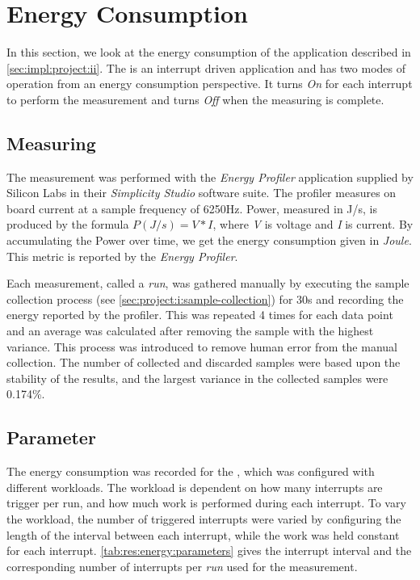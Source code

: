 \section{Energy Consumption}
\label{sec:res:energy}

In this section, we look at the energy consumption of the {\tracker} application described in \autoref{sec:impl:project:ii}.
The {\tracker} is an interrupt driven application and has two modes of operation from an energy consumption perspective.
It turns \emph{On} for each interrupt to perform the measurement and turns \emph{Off} when the measuring is complete.

\subsection{Measuring}
The measurement was performed with the \emph{Energy Profiler} application supplied by Silicon Labs in their \emph{Simplicity Studio} software suite.
The profiler measures on board current at a sample frequency of 6250Hz.
Power, measured in J/s, is produced by the formula $P (J/s) = V*I $, where \emph{V} is voltage and \emph{I} is current.
By accumulating the Power over time, we get the energy consumption given in \emph{Joule}.
This metric is reported by the \emph{Energy Profiler}.

Each measurement, called a \emph{run}, was gathered manually by executing the sample collection process (see \autoref{sec:project:i:sample-collection}) for 30s and recording the energy reported by the profiler.
This was repeated 4 times for each data point and an average was calculated after removing the sample with the highest variance.
This process was introduced to remove human error from the manual collection.
The number of collected and discarded samples were based upon the stability of the results, and the largest variance in the collected samples were 0.174\%.

\subsection{Parameter}

The energy consumption was recorded for the {\tracker}, which was configured with different workloads.
The workload is dependent on how many interrupts are trigger per run, and how much work is performed during each interrupt.
To vary the workload, the number of triggered interrupts were varied by configuring the length of the interval between each interrupt, while the work was held constant for each interrupt.
\autoref{tab:res:energy:parameters} gives the interrupt interval and the corresponding number of interrupts per \emph{run} used for the measurement.


